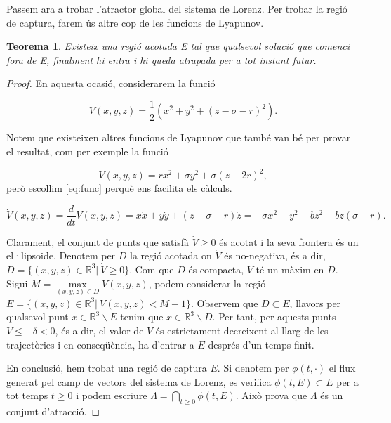 \documentclass[11pt,a4paper,openright,oneside]{article}
\numberwithin{equation}{section}
\newtheorem{teo}{Teorema}[section]
\theoremstyle{definition}
\begin{document}
Passem ara a trobar l'atractor global del sistema de Lorenz. Per trobar la regió de captura, farem ús altre cop de les funcions de Lyapunov. 

\begin{teo}
    Existeix una regió acotada E tal que qualsevol solució que comenci fora de E, finalment hi entra i hi queda atrapada per a tot instant futur.
\end{teo}

\begin{proof} En aquesta ocasió, considerarem la funció 

    \begin{equation} \label{eq:func}
        V(x,y,z)=\frac{1}{2}\left(x^{2}+y^{2}+(z-\sigma-r)^{2}\right).
    \end{equation}

    Notem que existeixen altres funcions de Lyapunov que també van bé per provar el resultat, com per exemple la funció 

    \begin{equation*}
        V(x,y,z)=rx^{2}+\sigma y^{2}+\sigma\left(z-2r\right)^{2},
    \end{equation*} però escollim \eqref{eq:func} perquè ens facilita els càlculs. 
    
    \begin{equation*} 
        \dot{V}(x,y,z)=\frac{d}{dt}V(x,y,z)=x\dot{x}+y\dot{y}+\left(z-\sigma-r\right)\dot{z}=-\sigma x^{2}-y^{2}-bz^{2}+bz(\sigma+r).
    \end{equation*}
    
    Clarament, el conjunt de punts que satisfà $\dot{V} \geq 0$ és acotat i la seva frontera és un el·lipsoide. Denotem per $D$ la regió acotada on $\dot{V}$ és no-negativa, és a dir, $D=\{(x,y,z)\in \mathbb{R}^{3}| \ \dot{V}\geq0\}$. Com que $D$ és compacta, $V$ té un màxim en $D$. Sigui $M=\max\limits_{(x,y,z)\in D}V(x,y,z)$, podem considerar la regió $E=\{(x,y,z)\in \mathbb{R}^{3}| \ V(x,y,z)< M+1\}$. Observem que $D\subset E$, llavors per qualsevol punt $x\in\mathbb{R}^{3}\backslash{E}$ tenim que $x\in\mathbb{R}^{3}\backslash{D}$. Per tant, per aquests punts $\dot{V}\leq-\delta<0$, és a dir, el valor de $V$ és estrictament decreixent al llarg de les trajectòries i en conseqüència, ha d'entrar a $E$ després d'un temps finit.
    
    En conclusió, hem trobat una regió de captura $E$. Si denotem per $\phi(t,\cdot)$ el flux generat pel camp de vectors del sistema de Lorenz, es verifica $\phi(t,E)\subset E$ per a tot temps $t\geq0$ i podem escriure $\Lambda=\bigcap\limits_{t\geq 0}\phi(t,E)$. Això prova que $\Lambda$ és un conjunt d'atracció. 
\end{proof}
\end{document}
